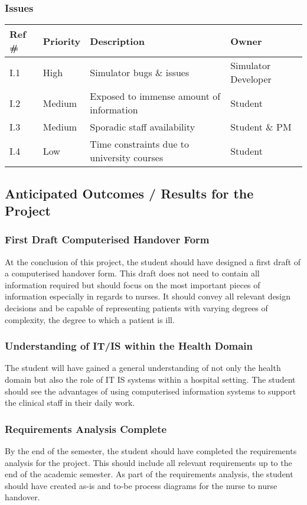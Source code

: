 \subsubsection{Issues}

\begin{tabular}{|l|l|l|l|}
\hline
{\bf Ref \#} & {\bf Priority} & {\bf Description} & {\bf Owner} \\
\hline
I.1 & High & Simulator bugs \& issues & Simulator Developer \\
\hline
I.2 & Medium & Exposed to immense amount of information & Student \\
\hline
I.3 & Medium & Sporadic staff availability  & Student \& PM \\
\hline
I.4 & Low & Time constraints due to university courses & Student \\
\hline
\end{tabular}


\newpage
\subsection{Anticipated Outcomes / Results for the Project}
\subsubsection{First Draft Computerised Handover Form}
At the conclusion of this project, the student should have designed a first draft of a computerised handover form. This draft does not need to contain all information required but should focus on the most important pieces of information especially in regards to nurses. It should convey all relevant design decisions and be capable of representing patients with varying degrees of complexity, the degree to which a patient is ill.

\subsubsection{Understanding of IT/IS within the Health Domain}
The student will have gained a general understanding of not only the health domain but also the role of IT IS systems within a hospital setting. The student should see the advantages of using computerised information systems to support the clinical staff in their daily work.
 
 \subsubsection{Requirements Analysis Complete}
By the end of the semester, the student should have completed the requirements analysis for the project. This should include all relevant requirements up to the end of the academic semester. As part of the requirements analysis, the student should have created as-is and to-be process diagrams for the nurse to nurse handover.


